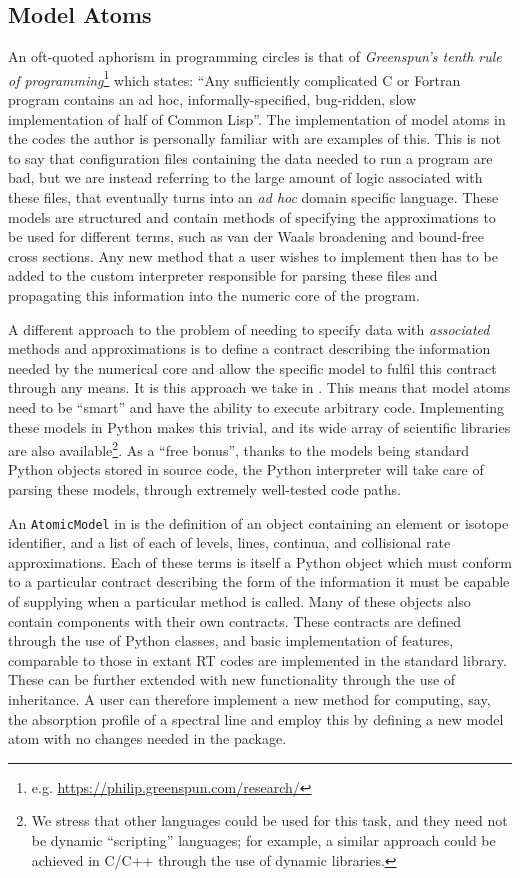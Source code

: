 \subsection{Model Atoms}

An oft-quoted aphorism in programming circles is that of \emph{Greenspun's tenth rule of programming}\footnote{e.g. \url{https://philip.greenspun.com/research/}} which states: ``Any sufficiently complicated C or Fortran program contains an ad hoc, informally-specified, bug-ridden, slow implementation of half of Common Lisp''.
The implementation of model atoms in the codes the author is personally familiar with are examples of this.
This is not to say that configuration files containing the data needed to run a program are bad, but we are instead referring to the large amount of logic associated with these files, that eventually turns into an \emph{ad hoc} domain specific language.
These models are structured and contain methods of specifying the approximations to be used for different terms, such as van der Waals broadening and bound-free cross sections.
Any new method that a user wishes to implement then has to be added to the custom interpreter responsible for parsing these files and propagating this information into the numeric core of the program.

A different approach to the problem of needing to specify data with \emph{associated} methods and approximations is to define a contract describing the information needed by the numerical core and allow the specific model to fulfil this contract through any means.
It is this approach we take in \Lw{}.
This means that model atoms need to be ``smart'' and have the ability to execute arbitrary code.
Implementing these models in Python makes this trivial, and its wide array of scientific libraries are also available\footnote{We stress that other languages could be used for this task, and they need not be dynamic ``scripting'' languages; for example, a similar approach could be achieved in C/C++ through the use of dynamic libraries.}.
As a ``free bonus'', thanks to the models being standard Python objects stored in source code, the Python interpreter will take care of parsing these models, through extremely well-tested code paths.

An \texttt{AtomicModel} in \Lw{} is the definition of an object containing an element or isotope identifier, and a list of each of levels, lines, continua, and collisional rate approximations.
Each of these terms is itself a Python object which must conform to a particular contract describing the form of the information it must be capable of supplying when a particular method is called.
Many of these objects also contain components with their own contracts.
These contracts are defined through the use of Python classes, and basic implementation of features, comparable to those in extant RT codes are implemented in the \Lw{} standard library.
These can be further extended with new functionality through the use of inheritance.
A user can therefore implement a new method for computing, say, the absorption profile \citep[e.g. the non Voigt profile of][]{Kowalski2017} of a spectral line and employ this by defining a new model atom with no changes needed in the \Lw{} package.


